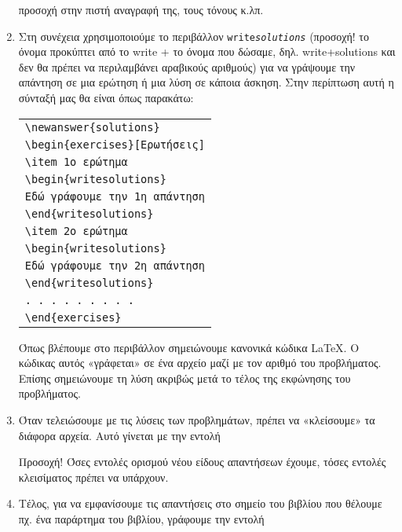 \begin{refsection}
\begin{enumerate}
προσοχή στην πιστή αναγραφή της, τους τόνους κ.λπ.
\item Στη συνέχεια χρησιμοποιούμε το περιβάλλον \texttt{write\textit{solutions}} (προσοχή! το όνομα προκύπτει από το write + το όνομα που δώσαμε, δηλ. write+solutions και δεν θα πρέπει να περιλαμβάνει αραβικούς αριθμούς) για να γράψουμε την απάντηση σε μια ερώτηση ή μια λύση σε κάποια άσκηση. Στην περίπτωση αυτή η σύνταξή μας θα είναι όπως παρακάτω:
\begin{center}
\begin{tabular}{l}
\verb=\newanswer{solutions}=\\
\verb=\begin{exercises}[Ερωτήσεις]=\\
\verb=\item 1ο ερώτημα=\\
\verb=\begin{writesolutions}=\\
\verb=Εδώ γράφουμε την 1η απάντηση=\\
\verb=\end{writesolutions}=\\
\verb=\item 2ο ερώτημα=\\
\verb=\begin{writesolutions}=\\
\verb=Εδώ γράφουμε την 2η απάντηση=\\
\verb=\end{writesolutions}=\\
\verb=. . . . . . . . .=\\
\verb=\end{exercises}=
\end{tabular}
\end{center}
Όπως βλέπουμε στο περιβάλλον σημειώνουμε κανονικά κώδικα \LaTeX.  Ο κώδικας αυτός «γράφεται» σε ένα αρχείο
μαζί με τον αριθμό του προβλήματος. Επίσης σημειώνουμε τη λύση ακριβώς μετά το τέλος της εκφώνησης του
προβλήματος.
\item Όταν τελειώσουμε με τις λύσεις των προβλημάτων, πρέπει να «κλείσουμε» τα διάφορα αρχεία. Αυτό γίνεται
με την εντολή
 \begin{center}
 \end{center}
Προσοχή! Όσες εντολές ορισμού νέου είδους απαντήσεων έχουμε, τόσες εντολές κλεισίματος πρέπει να υπάρχουν.
\item Τέλος, για να εμφανίσουμε τις απαντήσεις στο σημείο του βιβλίου που θέλουμε πχ. ένα παράρτημα του βιβλίου, γράφουμε την εντολή

\end{enumerate}
\end{refsection}
